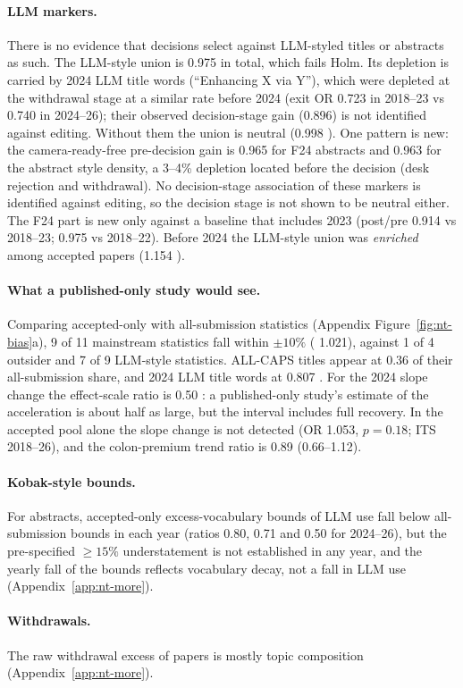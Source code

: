 \paragraph{LLM markers.}
There is no evidence that decisions select against LLM-styled titles or abstracts as such. The LLM-style union is 0.975  in total, which fails Holm. Its depletion is carried by 2024 LLM title words (``Enhancing X via Y''), which were depleted at the withdrawal stage at a similar rate before 2024 (exit OR 0.723 in 2018--23 vs 0.740 in 2024--26); their observed decision-stage gain (0.896) is not identified against editing. Without them the union is neutral (0.998 ). One pattern is new: the camera-ready-free pre-decision gain is 0.965  for F24 abstracts and 0.963  for the abstract style density, a 3--4\% depletion located before the decision (desk rejection and withdrawal). No decision-stage association of these markers is identified against editing, so the decision stage is not shown to be neutral either. The F24 part is new only against a baseline that includes 2023 (post/pre 0.914  vs 2018--23; 0.975  vs 2018--22). Before 2024 the LLM-style union was \emph{enriched} among accepted papers (1.154 ).

\paragraph{What a published-only study would see.}
Comparing accepted-only with all-submission statistics (Appendix Figure~\ref{fig:nt-bias}a), 9 of 11 mainstream statistics fall within $\pm 10\%$ (\NAME{} 1.021), against 1 of 4 outsider and 7 of 9 LLM-style statistics. ALL-CAPS titles appear at 0.36  of their all-submission share, and 2024 LLM title words at 0.807 . For the 2024 \NAME{} slope change the effect-scale ratio is 0.50 : a published-only study's estimate of the acceleration is about half as large, but the interval includes full recovery. In the accepted pool alone the slope change is not detected (OR 1.053, $p=0.18$; ITS 2018--26), and the colon-premium trend ratio is 0.89 (0.66--1.12).

\paragraph{Kobak-style bounds.}
For abstracts, accepted-only excess-vocabulary bounds of LLM use fall below all-submission bounds in each year (ratios 0.80, 0.71 and 0.50 for 2024--26), but the pre-specified $\geq 15\%$ understatement is not established in any year, and the yearly fall of the bounds reflects vocabulary decay, not a fall in LLM use (Appendix~\ref{app:nt-more}).

\paragraph{Withdrawals.}
The raw withdrawal excess of \NAME{} papers is mostly topic composition (Appendix~\ref{app:nt-more}).

